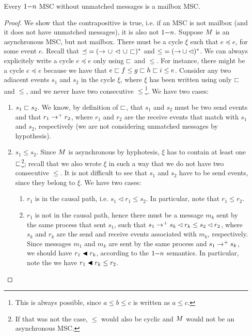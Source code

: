 \documentclass{article}
\begin{document}
\begin{proposition}\label{prop:onen_mb_no_unmatched}
	Every $1\mathsf{-}n$ MSC without unmatched messages is a mailbox MSC.
\end{proposition}
\begin{proof}
We show that the contrapositive is true, i.e. if an MSC is not mailbox (and it does not have unmatched messages), it is also not $1\mathsf{-}n$. Suppose $M$ is an asynchronous MSC, but not mailbox. There must be a cycle $\xi$ such that  $e \preceq e$, for some event $e$. Recall that ${\preceq} = ({\to} \,\cup\, {\lhd} \,\cup\, {\sqsubset})^\ast$ and ${\le} = ({\to} \cup {\lhd})^\ast$. We can always explicitely write a cycle $e \preceq e$ only using $\sqsubset$ and $\le$. For instance, there might be a cycle $e \preceq e$ because we have that $e \sqsubset f \le g \sqsubset h \sqsubset i \le e$. Consider any two adiacent events $s_1$ and $s_2$ in the cycle $\xi$, where $\xi$ has been written using only $\sqsubset$ and $\le$, and we never have two consecutive $\le$\footnote{This is always possible, since $a \le b \le c$ is written as $a \le c$.}. We have two cases:
\begin{enumerate}
	\item $s_1 \sqsubset s_2$. We know, by definition of $\sqsubset$, that $s_1$ and $s_2$ must be two send events and that $r_1 \to^+ r_2$, where $r_1$ and $r_2$ are the receive events that match with $s_1$ and $s_2$, respectively (we are not considering unmatched messages by hypothesis).
	\item $s_1 \le s_2$. Since $M$ is asynchronous by hyphotesis, $\xi$ has to contain at least one $\sqsubset$\footnote{If that was not the case, $\le$ would also be cyclic and $M$ would not be an asynchronous MSC.}; recall that we also wrote $\xi$ in such a way that we do not have two consecutive $\le$. It is not difficult to see that $s_1$ and $s_2$ have to be send events, since they belong to $\xi$. We have two cases:
	\begin{enumerate}
		\item $r_1$ is in the causal path, i.e. $s_1 \lhd r_1 \le s_2$. In particular, note that $r_1 \le r_2$.
		\item $r_1$ is not in the causal path, hence there must be a message $m_k$ sent by the same process that sent $s_1$, such that $s_1 \to^+ s_k \lhd r_k \le s_2 \lhd r_2$, where $s_k$ and $r_k$ are the send and receive events associated with $m_k$, respectively. Since messages $m_1$ and $m_k$ are sent by the same process and $s_1 \to^+ s_k$, we should have $r_1 \blacktriangleleft r_k$, according to the $1\mathsf{-}n$ semantics. In particular, note the we have $r_1 \blacktriangleleft r_k \le r_2$.

\end{enumerate}
\end{enumerate}
\end{proof}
\end{document}
